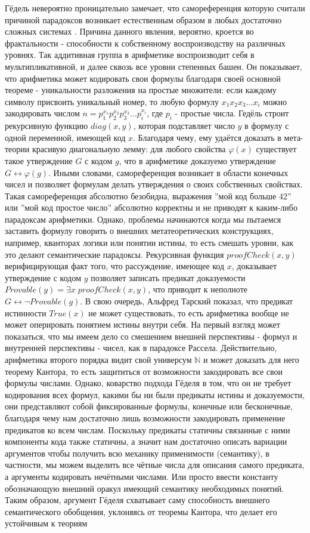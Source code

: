 \documentclass[12pt]{article}
\begin{document}
Гёдель невероятно проницательно замечает, что самореференция которую считали причиной парадоксов возникает естественным образом в любых достаточно сложных системах \cite{incompleteness-original}. Причина данного явления, вероятно, кроется во фрактальности - способности к собственному воспроизводству на различных уровнях. Так аддитивная группа в арифметике воспроизводит себя в мультипликативной, и далее сквозь все уровни степенных башен. Он показывает, что арифметика может кодировать свои формулы благодаря своей основной теореме - уникальности разложения на простые множители: если каждому символу присвоить уникальный номер, то любую формулу $x_1x_2x_3 \dots x_i$ можно закодировать числом $n = p_1^{x_1}p_2^{x_2}p_3^{x_3} \dots p_i^{x_i}$, где $p_i$ - простые числа. Гедёль строит рекурсивную функцию $diag(x, y)$, которая подставляет число $y$ в формулу с одной переменной, имеющей код $x$. Благодаря чему, ему удаётся доказать в мета-теории красивую диагональную лемму: для любого свойства $\varphi(x)$ существует такое утверждение $G$ с кодом $g$, что в арифметике доказуемо утверждение $G \leftrightarrow \varphi(g)$. Иными словами, самореференция возникает в области конечных чисел и позволяет формулам делать утверждения о своих собственных свойствах. Такая самореференция абсолютно безобидна, выражения ''мой код больше 42'' или ''мой код простое число'' абсолютно корректны и не приводят к каким-либо парадоксам арифметики. Однако, проблемы начинаются когда мы пытаемся заставить формулу говорить о внешних метатеоретических конструкциях, например, кванторах логики или понятии истины, то есть смешать уровни, как это делают семантические парадоксы. Рекурсивная функция $proofCheck(x, y)$ верифицирующая факт того, что рассуждение, имеющее код $x$, доказывает утверждение с кодом $y$ позволяет записать предикат доказуемости $Provable(y) = \exists x \; proofCheck(x, y)$, что приводит к неполноте $G \leftrightarrow \neg Provable(g)$. В свою очередь, Альфред Тарский показал, что предикат истинности $True(x)$ не может существовать, то есть арифметика вообще не может оперировать понятием истины внутри себя. На первый взгляд может показаться, что мы имеем дело со смешением внешней перспективы - формул и внутренней перспективы - чисел, как в парадоксе Рассела. Действительно, арифметика второго порядка видит свой универсум $\mathbb{N}$ и может доказать для него теорему Кантора, то есть защититься от возможности закодировать все свои формулы числами. Однако, коварство подхода Гёделя в том, что он не требует кодирования всех формул, какими бы ни были предикаты истины и доказуемости, они представляют собой фиксированные формулы, конечные или бесконечные, благодаря чему нам достаточно лишь возможности закодировать применение предикатов ко всем числам. Поскольку предикаты статичны связанные с ними компоненты кода также статичны, а значит нам достаточно описать вариации аргументов чтобы получить всю механику применимости (семантику), в частности, мы можем выделить все чётные числа для описания самого предиката, а аргументы кодировать нечётными числами. Или просто ввести константу обозначающую внешний оракул имеющий семантику необходимых понятий. Таким образом, аргумент Гёделя схватывает саму способность внешнего семантического обобщения, уклоняясь от теоремы Кантора, что делает его устойчивым к теориям 
\end{document}
